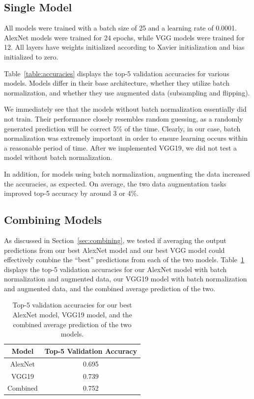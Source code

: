 \documentclass[10pt,twocolumn,letterpaper]{article}
\begin{document}
\subsection{Single Model}

All models were trained with a batch size of 25 and a learning rate of 0.0001. AlexNet models were trained for 24 epochs, while VGG models were trained for 12. All layers have weights initialized according to Xavier initialization and bias initialized to zero.

Table~\ref{table:accuracies} displays the top-5 validation accuracies for various models. Models differ in their base architecture, whether they utilize batch normalization, and whether they use augmented data (subsampling and flipping).

We immediately see that the models without batch normalization essentially did not train. Their performance closely resembles random guessing, as a randomly generated prediction will be correct 5\% of the time. Clearly, in our case, batch normalization was extremely important in order to ensure learning occurs within a reasonable period of time. After we implemented VGG19, we did not test a model without batch normalization.

In addition, for models using batch normalization, augmenting the data increased the accuracies, as expected. On average, the two data augmentation tasks improved top-5 accuracy by around 3 or 4\%.

\subsection{Combining Models}

As discussed in Section~\ref{sec:combining}, we tested if averaging the output predictions from our best AlexNet model and our best VGG model could effectively combine the ``best'' predictions from each of the two models. Table~\ref{table:combining} displays the top-5 validation accuracies for our AlexNet model with batch normalization and augmented data, our VGG19 model with batch normalization and augmented data, and the combined average prediction of the two.

{\renewcommand{\arraystretch}{1.25}%
\begin{table}[ht]
\begin{center}
\begin{tabular}{ | c | c | }
\hline
Model & Top-5 Validation Accuracy \\
\hline\hline
AlexNet & 0.695 \\
VGG19 & 0.739 \\
Combined & 0.752 \\
\hline
\end{tabular}
\end{center}
\caption{Top-5 validation accuracies for our best AlexNet model, VGG19 model, and the combined average prediction of the two models.}
\label{table:combining}
\end{table}
}
\end{document}
